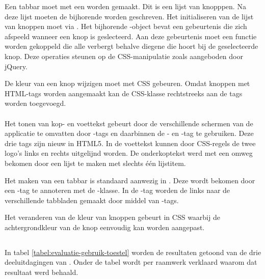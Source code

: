 Een tabbar moet met een  worden gemaakt.
Dit is een lijst van knopppen.
Na deze lijst moeten de bijhorende  worden geschreven.
Het initialiseren van de lijst van knoppen moet via .
Het bijhorende \js-object bevat een  gebeurtenis die zich afspeeld wanneer een knop is geslecteerd.
Aan deze gebeurtenis moet een functie worden gekoppeld die alle  verbergt behalve diegene die hoort bij de geselecteerde knop.
Deze operaties steunen op de CSS-manipulatie zoals aangeboden door jQuery.

De kleur van een knop wijzigen moet met CSS gebeuren.
Omdat knoppen met HTML-tags worden aangemaakt kan de CSS-klasse rechtstreeks aan de tags worden toegevoegd.

\paragraph{\lungo}
Het tonen van kop- en voettekst gebeurt door de verschillende schermen van de applicatie te omvatten door -tags en daarbinnen de - en -tag te gebruiken.
Deze drie tags zijn nieuw in HTML5.
In de voettekst kunnen door CSS-regels de twee logo's links en rechts uitgelijnd worden.
De onderkoptekst werd met een omweg bekomen door een lijst te maken met slechts één lijstitem.

Het maken van een tabbar is standaard aanwezig in \lungo{}.
Deze wordt bekomen door een -tag te annoteren met de -klasse.
In de -tag worden de links naar de verschillende tabbladen gemaakt door middel van -tags.

Het veranderen van de kleur van knoppen gebeurt in CSS waarbij de achtergrondkleur van de knop eenvoudig kan worden aangepast.


\subsection{}
\label{sec:evaluatie-gebruik-toestel}

In tabel \ref{tabel:evaluatie-gebruik-toestel} worden de resultaten getoond van de drie deeluitdagingen van .
Onder de tabel wordt per raamwerk verklaard waarom dat resultaat werd behaald.

